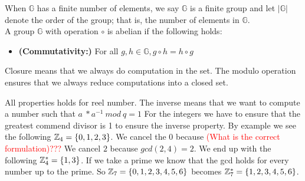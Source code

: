 \begin{defi}
\begin{itemize}
\end{itemize}
When \begin{math}\mathbb{G}\end{math} has a finite number of elements, we say \begin{math}\mathbb{G}\end{math} is a finite group and let
\begin{math}| \mathbb{G}|\end{math} denote the order of the group; that is, the number of elements in \begin{math}\mathbb{G}\end{math}. \\
A group \begin{math}\mathbb{G}\end{math} with operation \begin{math}\circ\end{math} is abelian if the following holds:
\begin{itemize}
\item \textnormal{\textbf{(Commutativity:)}} For all \begin{math}g, h \in \mathbb{G}, g \circ h = h \circ g \end{math}
\end{itemize}
\end{defi}

 Closure means that we always do computation in the set. The modulo operation ensures that we always reduce computations into a closed set.

 All properties holds for reel number. The inverse means that we want to compute a number such that \begin{math}a\ * a^{-1} \ mod \ q = 1 \end{math}  For the integers we have to ensure that the greatest commend divisor is 1 to ensure the inverse property. By example we see the following \begin{math} \mathbb{Z}_4 = \{0,1,2,3\}\end{math}. We cancel the \begin{math}0\end{math} because \textcolor{red}{(What is the correct formulation)???} We cancel \begin{math}2\end{math} because \begin{math}gcd(2,4)=2\end{math}. We end up with the following \begin{math} \mathbb{Z}_4^* = \{1,3\}\end{math}. If we take a prime we know that the gcd holds for every number up to the prime. So  \begin{math} \mathbb{Z}_7 = \{0,1,2,3,4,5,6\}\end{math} becomes \begin{math} \mathbb{Z}_7^* = \{1,2,3,4,5,6\}\end{math}.

